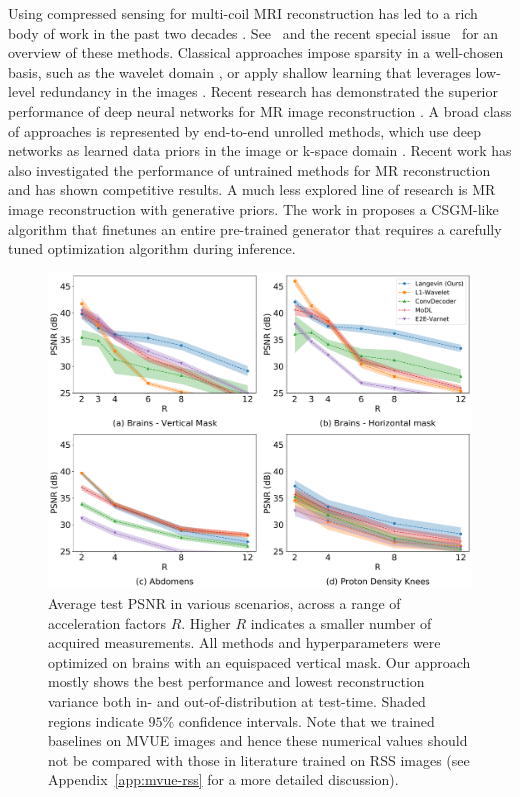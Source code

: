 Using compressed sensing for multi-coil MRI reconstruction has led to
a rich body of work in the past two decades \cite{lustig2007sparse,
deshmane2012parallel, uecker2014espirit, rosenzweig2018simultaneous}.
See~\cite{doneva2021csmri} and the recent special
issue~\cite{doneva2020ieeespsguest} for an overview of these methods.
Classical approaches impose sparsity in a well-chosen basis, such as
the wavelet domain \cite{lustig2007sparse}, or apply shallow learning
that leverages low-level redundancy in the images
\cite{bresler2011dictionarylearning, ravishankar2017datadriven,
bresler2020ieeesps}.  Recent research has demonstrated the superior
performance of deep neural networks for MR image reconstruction
\cite{schlemper2017deep, hammernik2018learning,
aggarwal2018modl,sriram2020end, Sriram_2020_CVPR}.  A broad class of
approaches is represented by end-to-end unrolled methods, which use
deep networks as learned data priors in the image
\cite{aggarwal2018modl, hammernik2018learning, sriram2020end} or
k-space domain \cite{sriram2020grappanet}. Recent work has also
investigated the performance of untrained methods
\cite{ulyanov2018deep, heckel2020compressive} for MR reconstruction
and has shown competitive results. A much less explored line of
research is MR image reconstruction with generative priors. The work
in \cite{narnhofer2019inverse} proposes a CSGM-like algorithm that
finetunes an entire pre-trained generator that requires a carefully
tuned optimization algorithm during inference.

\begin{figure}[t]
    \centering
    \includegraphics[width=\columnwidth]{main-psnr-comp.pdf}
    \caption{\small Average test PSNR in various scenarios, across a range of acceleration factors $R$. Higher $R$ indicates a smaller number of acquired measurements. All methods and hyperparameters were optimized on brains with an equispaced vertical mask. Our approach mostly shows the best performance and lowest reconstruction variance both in- and out-of-distribution at test-time. Shaded regions indicate $95\%$ confidence intervals. Note that we trained baselines on MVUE images and hence these numerical values should not be compared with those in literature trained on RSS images (see Appendix~\ref{app:mvue-rss} for a more detailed discussion).}
    \label{fig:main-psnr}
\end{figure}

